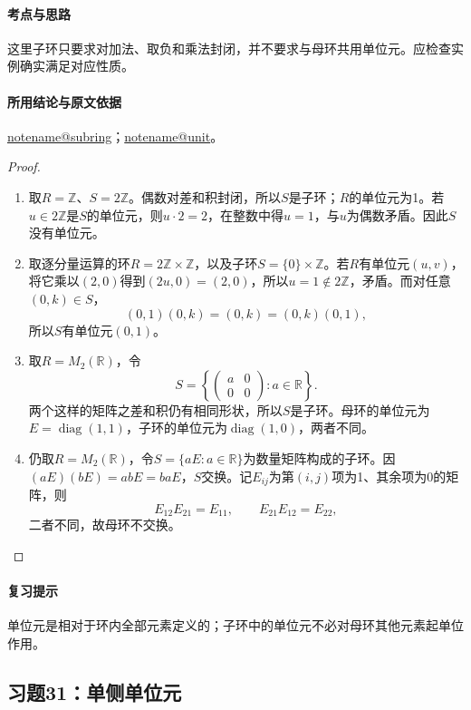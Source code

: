 \documentclass[UTF8,a4paper,11pt,fontset=windows]{ctexart}
\makeatletter
\newcommand{\Z}{\mathbb Z}\newcommand{\Q}{\mathbb Q}
\newcommand{\R}{\mathbb R}\newcommand{\C}{\mathbb C}
\newcommand{\noteref}[1]{\hyperref[note:#1]{\csname notename@#1\endcsname}}
\newcommand{\exref}[2]{\hyperref[ex:#1:#2]{第#1章习题#2}}
\makeatother
\begin{document}
\paragraph{考点与思路}
这里子环只要求对加法、取负和乘法封闭，并不要求与母环共用单位元。应检查实例确实满足对应性质。

\paragraph{所用结论与原文依据}
\noteref{subring}；\noteref{unit}。


\begin{proof}
\begin{enumerate}\item 取$R=\Z$、$S=2\Z$。偶数对差和积封闭，所以$S$是子环；$R$的单位元为1。若$u\in2\Z$是$S$的单位元，则$u\cdot2=2$，在整数中得$u=1$，与$u$为偶数矛盾。因此$S$没有单位元。

\item 取逐分量运算的环$R=2\Z\times\Z$，以及子环$S=\{0\}\times\Z$。若$R$有单位元$(u,v)$，将它乘以$(2,0)$得到$(2u,0)=(2,0)$，所以$u=1\notin2\Z$，矛盾。而对任意$(0,k)\in S$，
\[
(0,1)(0,k)=(0,k)=(0,k)(0,1),
\]
所以$S$有单位元$(0,1)$。

\item 取$R=M_2(\R)$，令
\[
S=\left\{\begin{pmatrix}a&0\\0&0\end{pmatrix}:a\in\R\right\}.
\]
两个这样的矩阵之差和积仍有相同形状，所以$S$是子环。母环的单位元为$E=\operatorname{diag}(1,1)$，子环的单位元为$\operatorname{diag}(1,0)$，两者不同。

\item 仍取$R=M_2(\R)$，令$S=\{aE:a\in\R\}$为数量矩阵构成的子环。因$(aE)(bE)=abE=baE$，$S$交换。记$E_{ij}$为第$(i,j)$项为1、其余项为0的矩阵，则
\[
E_{12}E_{21}=E_{11},\qquad E_{21}E_{12}=E_{22},
\]
二者不同，故母环不交换。
\end{enumerate}
\end{proof}

\paragraph{复习提示}
单位元是相对于环内全部元素定义的；子环中的单位元不必对母环其他元素起单位作用。


\subsection{习题31：\texorpdfstring{单侧单位元}{单侧单位元}}
\label{ex:1:31}
\end{document}
